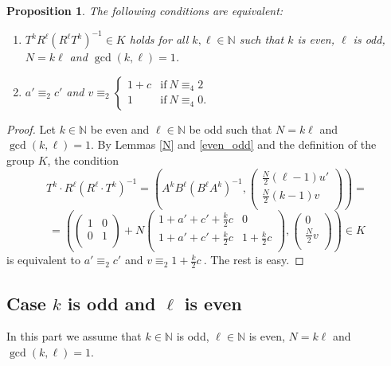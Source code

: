 \documentclass[10pt]{amsart}
\theoremstyle{plain}
\newtheorem{proposition}[theorem]{Proposition}
\theoremstyle{definition}
\theoremstyle{remark}%
\newcommand{\N}{\mathbb{N}}
\newcommand{\mat}[4]{\left(\begin{array}{cc}
 #1 & #2\\
 #3 & #4\\
\end{array}\right)}
\newcommand{\vc}[2]{\left(\begin{array}{c}
 #1 \\
 #2\\
\end{array}\right)}
\begin{document}
\begin{proposition}\label{3.3}
The following conditions are equivalent:
\begin{enumerate}
\item[(i)] $T^{k}R^{\ell}(R^{\ell}T^{k})^{-1}\in K$  holds for all $k,\ell\in \N$ such that $k$ is even, $\ell$ is odd, $N=k\ell$ and $\gcd(k,\ell)=1$. 
 \item[(ii)] $a'\equiv_2 c'$ and $v\equiv_2\begin{cases} 1+c & \text{if}\ N\equiv_4 2\\ 1 & \text{if}\ N\equiv_4 0 .\end{cases}$
\end{enumerate}
\end{proposition}
\begin{proof}
Let $k\in \N$ be even and $\ell\in \N$ be odd such that $N=k\ell$ and $\gcd(k,\ell)=1$. By Lemmas \ref{N} and  \ref{even_odd} and the definition of the group $K$, the condition 
$$T^k\cdot R^\ell\left(R^\ell\cdot T^k\right)^{-1}=\left(A^kB^\ell(B^\ell A^k)^{-1},\vc{\frac{N}{2}(\ell-1)u'}{\frac{N}{2}(k-1)v}\right)=$$
$$=\left(\mat{1}{0}{0}{1}+N
 \mat{1+a'+c'+\frac{k}{2}c}{0}{1+a'+c'+\frac{k}{2}c}{1+\frac{k}{2}c},\vc{0}{\frac{N}{2}v}\right)\in K$$
is equivalent to 
$a'\equiv_2 c'$  and 
$v\equiv_2 1+\frac{k}{2}c\ .$
The rest is easy.
\end{proof}







\subsection{Case $k$ is odd and $\ell$ is even}

In this part we assume that $k\in\N$ is odd, $\ell\in\N$ is even, $N=k\ell$ and $\gcd(k,\ell)=1$.
\end{document}

